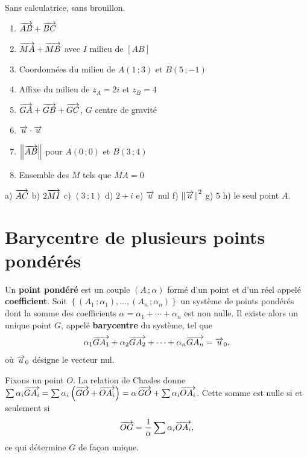 \begin{automatismes}
Sans calculatrice, sans brouillon.

\begin{enumerate}[label=\textbf{\alph*)}, leftmargin=*, itemsep=0.25em]
  \item $\overrightarrow{AB}+\overrightarrow{BC}$
  \item $\overrightarrow{MA}+\overrightarrow{MB}$ avec $I$ milieu de $[AB]$
  \item Coordonnées du milieu de $A(1\,;3)$ et $B(5\,;-1)$
  \item Affixe du milieu de $z_{A} = 2i$ et $z_{B} = 4$
  \item $\overrightarrow{GA}+\overrightarrow{GB}+\overrightarrow{GC}$, $G$ centre de gravité
  \item $\overrightarrow{u} \cdot \overrightarrow{u}$
  \item $\left\lVert \overrightarrow{AB} \right\rVert$ pour $A(0\,;0)$ et $B(3\,;4)$
  \item Ensemble des $M$ tels que $MA = 0$
\end{enumerate}
\end{automatismes}

\begin{corrige}[automatismes]
a) $\overrightarrow{AC}$ \quad b) $2\overrightarrow{MI}$ \quad c) $(3\,;1)$ \quad
d) $2+i$ \quad e) $\overrightarrow{u}$ nul \quad f) $\left\lVert \overrightarrow{u} \right\rVert^{2}$ \quad
g) $5$ \quad h) le seul point $A$.
\end{corrige}

\section{Barycentre de plusieurs points pondérés}

\begin{definition}
Un \textbf{point pondéré} est un couple $(A\,;\alpha)$ formé d'un point et
d'un réel appelé \textbf{coefficient}. Soit
$\left\{(A_{1}\,;\alpha_{1}),\dots,(A_{n}\,;\alpha_{n})\right\}$ un système de
points pondérés dont la somme des coefficients
$\alpha = \alpha_{1}+\cdots+\alpha_{n}$ est non nulle. Il existe alors un
unique point $G$, appelé \textbf{barycentre} du système, tel que
\[
  \alpha_{1}\overrightarrow{GA_{1}}+\alpha_{2}\overrightarrow{GA_{2}}+\cdots
  +\alpha_{n}\overrightarrow{GA_{n}} = \overrightarrow{u}_{0},
\]
où $\overrightarrow{u}_{0}$ désigne le vecteur nul.
\end{definition}

\begin{demonstration}
Fixons un point $O$. La relation de Chasles donne
$\sum \alpha_{i}\overrightarrow{GA_{i}} = \sum \alpha_{i}
\left(\overrightarrow{GO}+\overrightarrow{OA_{i}}\right)
= \alpha\,\overrightarrow{GO}+\sum \alpha_{i}\overrightarrow{OA_{i}}$. Cette somme est nulle si et
seulement si
\[
  \overrightarrow{OG} = \frac{1}{\alpha}\sum \alpha_{i}\overrightarrow{OA_{i}},
\]
ce qui détermine $G$ de façon unique.
\end{demonstration}

